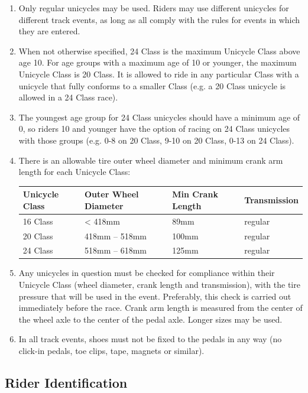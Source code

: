 \begin{enumerate}[leftmargin=1.5em,labelsep=*]
  \item Only regular unicycles may be used.
  Riders may use different unicycles for different track events, as long as all comply with the rules for events in which they are entered.

  \item When not otherwise specified, 24 Class is the maximum Unicycle Class above age 10.
	  For age groups with a maximum age of 10 or younger, the maximum Unicycle Class is 20 Class. It is allowed to ride in any particular Class 
    with a unicycle that fully conforms to a smaller Class (e.g. a 20 Class unicycle is allowed in a 24 Class race).
  \item The youngest age group for 24 Class unicycles should have a minimum age of 0, so riders 10 and younger have the option of racing on 24 Class
    unicycles with those groups (e.g. 0-8 on 20 Class, 9-10 on 20 Class, 0-13 on 24 Class).
  \item There is an allowable tire outer wheel diameter and minimum crank arm length for each Unicycle Class:
  \begin{longtable}{|p{2.8cm}|p{4.6cm}|p{3.6cm}|p{2.5cm}|}
    \hline
    \textbf{Unicycle Class} & \textbf{Outer Wheel Diameter} & \textbf{Min Crank Length} & \textbf{Transmission}\\
    \hline
    16 Class & < 418mm & 89mm & regular \\
    \hline
    20 Class & 418mm -- 518mm & 100mm & regular \\
    \hline
    24 Class & 518mm -- 618mm & 125mm & regular \\
    \hline
  \end{longtable}
  \item Any unicycles in question must be checked for compliance within their Unicycle Class (wheel diameter, crank length and transmission), 
    with the tire pressure that will be used in the event.
    Preferably, this check is carried out immediately before the race. 
    Crank arm length is measured from the center of the wheel axle to the center of the pedal axle.
    Longer sizes may be used.
  \item In all track events, shoes must not be fixed to the pedals in any way (no click-in pedals, toe clips, tape, magnets or similar).
\end{enumerate}

\subsection{Rider Identification}


